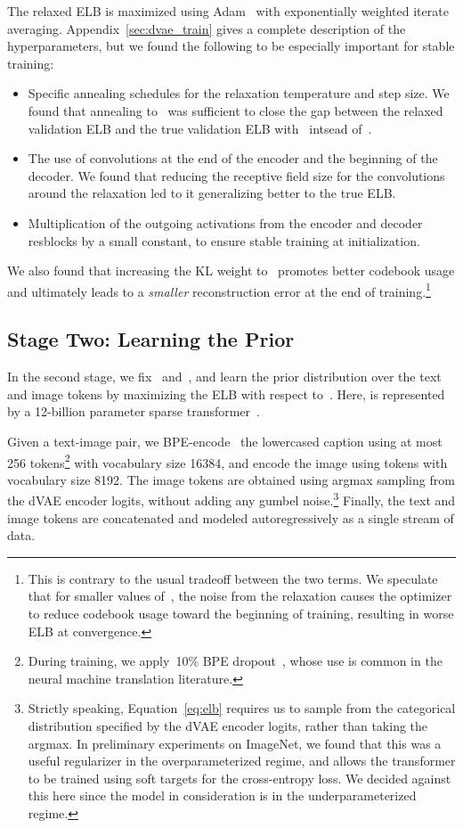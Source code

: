 \documentclass{article}
\begin{document}
The relaxed ELB is maximized using Adam~\cite{kingma2014adam} with exponentially weighted iterate averaging. Appendix~\ref{sec:dvae_train} gives a complete description of the hyperparameters, but we found the following to be especially important for stable training:
\begin{itemize}
    \item Specific annealing schedules for the relaxation temperature and step size. We found that annealing  to~ was sufficient to close the gap between the relaxed validation ELB and the true validation ELB with~ intsead of~.
    \item The use of  convolutions at the end of the encoder and the beginning of the decoder. We found that reducing the receptive field size for the convolutions around the relaxation led to it generalizing better to the true ELB.
    \item Multiplication of the outgoing activations from the encoder and decoder resblocks by a small constant, to ensure stable training at initialization.
\end{itemize}
We also found that increasing the KL weight to~ promotes better codebook usage and ultimately leads to a \emph{smaller} reconstruction error at the end of training.\footnote{This is contrary to the usual tradeoff between the two terms. We speculate that for smaller values of~, the noise from the relaxation causes the optimizer to reduce codebook usage toward the beginning of training, resulting in worse ELB at convergence.}
\subsection{Stage Two: Learning the Prior}
\label{sec:learning_prior}
In the second stage, we fix~ and~, and learn the prior distribution over the text and image tokens by maximizing the ELB with respect to~. Here,  is represented by a 12-billion parameter sparse transformer~\cite{child2019generating}.

Given a text-image pair, we BPE-encode~\cite{sennrich2015neural} the lowercased caption using at most 256 tokens\footnote{During training, we apply~10\% BPE dropout~\cite{provilkov2019bpe}, whose use is common in the neural machine translation literature.} with vocabulary size \num{16384}, and encode the image using  tokens with vocabulary size \num{8192}. The image tokens are obtained using argmax sampling from the dVAE encoder logits, without adding any gumbel noise.\footnote{Strictly speaking, Equation~\ref{eq:elb} requires us to sample from the categorical distribution specified by the dVAE encoder logits, rather than taking the argmax. In preliminary experiments on ImageNet, we found that this was a useful regularizer in the overparameterized regime, and allows the transformer to be trained using soft targets for the cross-entropy loss. We decided against this here since the model in consideration is in the underparameterized regime.} Finally, the text and image tokens are concatenated and modeled autoregressively as a single stream of data.
\end{document}
